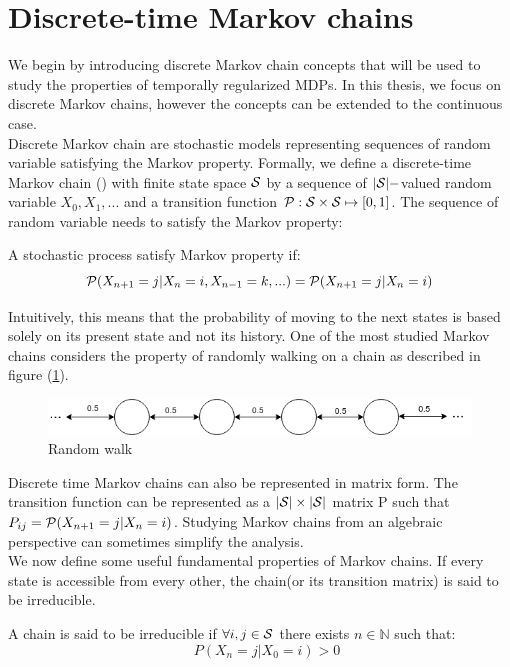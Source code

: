 \section{Discrete-time Markov chains}
We begin by introducing discrete Markov chain concepts that will be used to study the properties of temporally regularized MDPs. In this thesis, we focus on discrete Markov chains, however the concepts can be extended to the continuous case.\\ Discrete Markov chain are stochastic models representing sequences of random variable satisfying the Markov property. Formally, we define a discrete-time Markov chain (\cite{norris1998markov,levin2017markov,bremaud2013markov})  with finite state space $\mathcal{S}$ by a sequence of $|\mathcal{S}|-$valued random variable $X_0,X_1,..$. and a transition function $\mathcal{P} : \mathcal{S} \times \mathcal{S} \mapsto [0,1]$. The sequence of random variable needs to satisfy the Markov property:
\begin{definition}
A stochastic process satisfy Markov property if:
\begin{equation}
    \mathcal{P} (X_{n+1}=j|X_n = i,X_{n-1}=k,...) = \mathcal{P} (X_{n+1}=j|X_n = i)
\end{equation}
\end{definition}
Intuitively, this means that the probability of moving to the next states is based solely on its present state and not its history. One of the most studied Markov chains considers the property of randomly walking on a chain as described in figure (\ref{fig:random_walk}).\\
\begin{figure}
    \centering
    \includegraphics[scale=0.7]{fig/Markov_chain.png}
    \caption{Random walk}
    \label{fig:random_walk}
\end{figure}
Discrete time Markov chains can also be represented in matrix form. The transition function can be represented as a $|\mathcal{S}| \times |\mathcal{S}|$ matrix P such that $P_{ij} = \mathcal{P}(X_{n+1}=j|X_n=i)$. Studying Markov chains from an algebraic perspective can sometimes simplify the analysis.  \\
We now define some useful fundamental properties of Markov chains.
If every state is accessible from every other, the chain(or its transition matrix) is said to be irreducible. 
\begin{definition}
A chain is said to be irreducible if $\forall i,j \in \mathcal{S}$ there exists $n \in \mathbb{N}$ such that:
\begin{equation}
      \quad P(X_n = j|X_0=i) > 0
\end{equation}
\end{definition}
